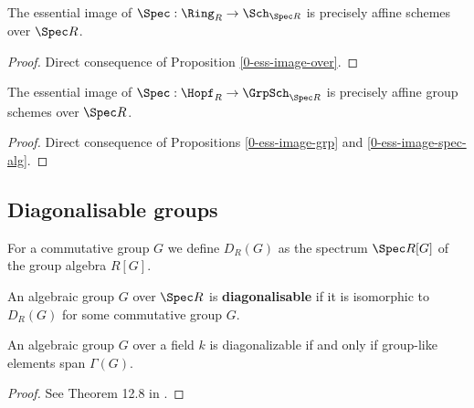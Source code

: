 \begin{proposition}
  \label{0-ess-image-spec-alg}
  \leanok

  The essential image of $\Spec : \Ring_R \to \Sch_{\Spec R}$ is precisely affine schemes over $\Spec R$.
\end{proposition}
\begin{proof}
  \leanok

  Direct consequence of Proposition \ref{0-ess-image-over}.
\end{proof}


\begin{proposition}
  \label{0-ess-image-spec-hopf}
  \leanok

  The essential image of $\Spec : \Hopf_R \to \GrpSch_{\Spec R}$ is precisely affine group schemes over $\Spec R$.
\end{proposition}
\begin{proof}
  \leanok

  Direct consequence of Propositions \ref{0-ess-image-grp} and \ref{0-ess-image-spec-alg}.
\end{proof}


\subsection{Diagonalisable groups}


\begin{definition}
  \label{0-spec-grp-alg}
  \leanok

  For a commutative group $G$ we define $D_R(G)$ as the spectrum $\Spec R[G]$ of the group algebra $R[G]$.
\end{definition}


\begin{definition}
  \label{0-diag}

  An algebraic group $G$ over $\Spec R$ is {\bf diagonalisable} if it is isomorphic to $D_R(G)$ for some commutative group $G$.
\end{definition}


\begin{theorem}
  \label{0-diag-iff-grp-like-span}
  \leanok

  An algebraic group $G$ over a field $k$ is diagonalizable if and only if group-like elements span $\Gamma(G)$.
\end{theorem}
\begin{proof}

  See Theorem 12.8 in \cite{Milne_2017}.
\end{proof}


